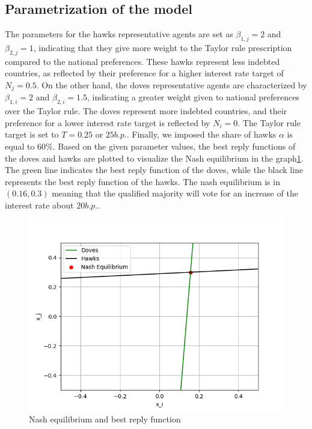 \documentclass[12pt]{article}
\begin{document}
\subsection{Parametrization of the model}
The parameters for the hawks representative agents are set as $\beta_{1,j} = 2$ and $\beta_{2,j} = 1$, indicating that
they give more weight to the Taylor rule prescription compared to the national preferences. These hawks represent less
indebted countries, as reflected by their preference for a higher interest rate target of $N_{j} = 0.5$. On the other
hand, the doves representative agents are characterized by $\beta_{1,i} = 2$ and $\beta_{2,i} = 1.5$, indicating a
greater weight given to national preferences over the Taylor rule. The doves represent more indebted countries, and
their preference for a lower interest rate target is reflected by $N_{i} = 0$. The Taylor rule target is set to $T =
0.25$ or $25b.p.$. Finally, we imposed the share of hawks $\alpha$ is equal to $60\%$. 
Based on the given parameter values, the best
reply functions of the doves and hawks are plotted to visualize the Nash equilibrium in  the graph\ref{figure1}. 
The green line indicates the best 
reply function of the doves, while the black line represents the best reply function of the hawks.
The nash equilibrium is in $(0.16,0.3)$ meaning that the qualified majority will vote for an increase of the interest
rate  about $20b.p.$.
\begin{figure}[h]
    \centering
    \includegraphics[scale=0.8]{plot.png}
    \caption{Nash equilibrium and best reply function\label{figure1}}
\end{figure}
\end{document}
